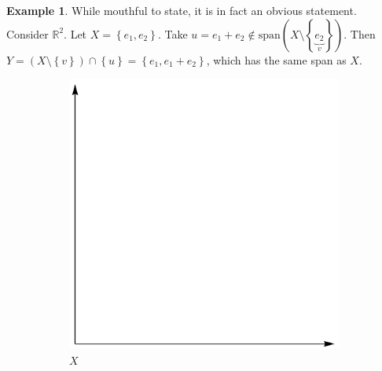 \documentclass[12pt, a4paper]{article}
\newcommand{\R}{\mathbb{R}}
\newcommand{\spantext}{\text{span}}
\theoremstyle{remark}
\theoremstyle{definition}
\newtheorem{example}{Example}
\numberwithin{equation}{section}
\numberwithin{definition}{section}
\numberwithin{example}{section}
\numberwithin{exercise}{section}
\numberwithin{remark}{section}
\numberwithin{figure}{section}
\begin{document}
\begin{example}
    While mouthful to state, it is in fact an obvious statement.
    Consider $\R^2$. Let $X = \left\{ e_1, e_2 \right\}$.
    Take $u = e_1 + e_2 \not\in \spantext \left( X \setminus \left\{ \underbrace{e_2}_{v} \right\} \right)$.
    Then $Y = \left( X \setminus \left\{ v \right\} \right) \cap \left\{ u \right\} = \left\{ e_1, e_1 + e_2 \right\}$, which has the same span as $X$.
    \begin{figure}[h]
        \centering
        \begin{subfigure}[b]{0.45\textwidth}
            \centering
            \includegraphics[width=\textwidth]{Steinitz1}
            \caption{$X$}
        \end{subfigure}
        \hfill
        \begin{subfigure}[b]{0.45\textwidth}
            \centering

\end{subfigure}
\end{figure}
\end{example}
\end{document}
